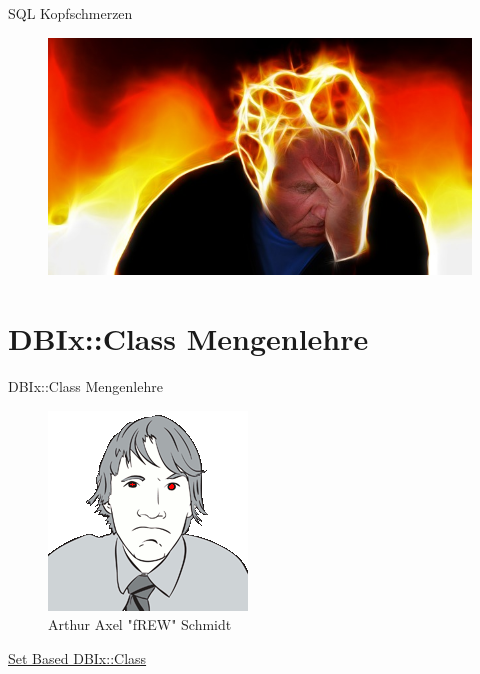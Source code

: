 \begin{frame}{SQL Kopfschmerzen}
\begin{figure}[!ht]
\centering
\includegraphics[width=1\linewidth]{img/stress.jpg}
\end{figure}
\end{frame}


\section{DBIx::Class Mengenlehre}


\begin{frame}[fragile]{DBIx::Class Mengenlehre}
\begin{figure}[!ht]
\centering
\includegraphics[width=0.4\linewidth]{img/frew.png}
\caption{Arthur Axel "fREW" Schmidt}
\end{figure}
\centering
\href{http://www.perladvent.org/2012/2012-12-21.html}{Set Based DBIx::Class}
\end{frame}


